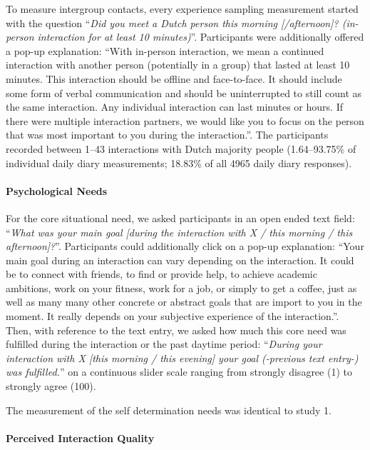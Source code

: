 \documentclass[man, 12pt, a4paper]{apa7}
\theoremstyle{break}
\theoremstyle{plain}
\begin{document}
To measure intergroup contacts, every experience sampling measurement
started with the question
``\textit{Did you meet a Dutch person this morning [/afternoon]? (in-person interaction for at least 10 minutes)}''.
Participants were additionally offered a pop-up explanation: ``With
in-person interaction, we mean a continued interaction with another
person (potentially in a group) that lasted at least 10 minutes. This
interaction should be offline and face-to-face. It should include some
form of verbal communication and should be uninterrupted to still count
as the same interaction. Any individual interaction can last minutes or
hours. If there were multiple interaction partners, we would like you to
focus on the person that was most important to you during the
interaction.''. The participants recorded between 1--43 interactions
with Dutch majority people (1.64--93.75\% of individual daily diary
measurements; 18.83\% of all 4965 daily diary responses).

\paragraph{Psychological Needs}

For the core situational need, we asked participants in an open ended
text field:
``\textit{What was your main goal [during the interaction with X / this morning / this afternoon]?}''.
Participants could additionally click on a pop-up explanation: ``Your
main goal during an interaction can vary depending on the interaction.
It could be to connect with friends, to find or provide help, to achieve
academic ambitions, work on your fitness, work for a job, or simply to
get a coffee, just as well as many many other concrete or abstract goals
that are import to you in the moment. It really depends on your
subjective experience of the interaction.''. Then, with reference to the
text entry, we asked how much this core need was fulfilled during the
interaction or the past daytime period:
``\textit{During your interaction with X [this morning / this evening] your goal (-previous text entry-) was fulfilled.}''
on a continuous slider scale ranging from strongly disagree (1) to
strongly agree (100).

The measurement of the self determination needs was identical to study
1.

\paragraph{Perceived Interaction Quality}
\end{document}
